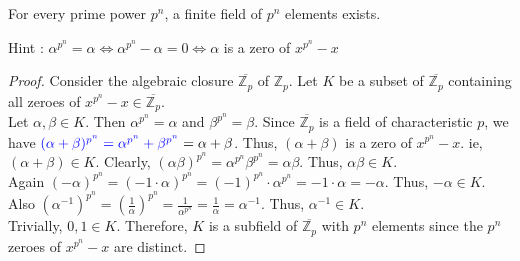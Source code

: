 \begin{theorem}
	For every prime power $p^n$, a finite field of $p^n$ elements exists.
\end{theorem}
{\color{blue} Hint : $\alpha^{p^n} = \alpha \iff \alpha^{p^n} - \alpha = 0 \iff \alpha$ is a zero of $x^{p^n} - x$}
\begin{proof}
	Consider the algebraic closure $\overline{\mathbb{Z}_p}$ of $\mathbb{Z}_p$.
	Let $K$ be a subset of $\overline{\mathbb{Z}_p}$ containing all zeroes of $x^{p^n}-x \in \overline{\mathbb{Z}_p}$.\\
	
	Let $\alpha, \beta \in K$.
	Then $\alpha^{p^n} = \alpha$ and $\beta^{p^n} = \beta$.
	Since $\overline{\mathbb{Z}_p}$ is a field of characteristic $p$, we have ${\color{blue}(\alpha+\beta)^{p^n} = \alpha^{p^n}+ \beta^{p^n}} = \alpha + \beta$.
	Thus, $(\alpha+\beta)$ is a zero of $x^{p^n}-x$.
	ie, $(\alpha + \beta) \in K$.
	Clearly, $(\alpha\beta)^{p^n} = \alpha^{p^n} \beta^{p^n} = \alpha\beta$.
	Thus, $\alpha\beta \in K$.\\


	Again $(-\alpha)^{p^n} = (-1 \cdot \alpha)^{p^n} = (-1)^{p^n} \cdot \alpha^{p^n} = -1 \cdot \alpha = -\alpha$.
	Thus, $-\alpha \in K$.
	Also $(\alpha^{-1})^{p^n} = \left( \frac{1}{\alpha} \right)^{p^n} = \frac{1}{\alpha^{p^n}} = \frac{1}{\alpha} = \alpha^{-1}$.
	Thus, $\alpha^{-1} \in K$.\\
	

	Trivially, $0,1 \in K$.
	Therefore, $K$ is a subfield of $\overline{\mathbb{Z}_p}$ with $p^n$ elements since {\color{blue}the $p^n$ zeroes of $x^{p^n}-x$ are distinct}.
\end{proof}

